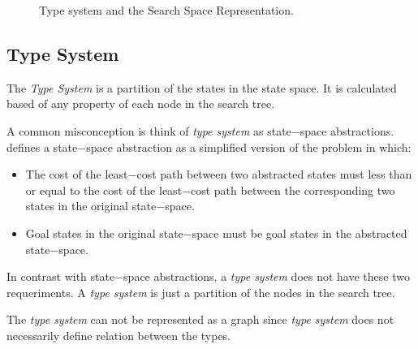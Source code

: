 \begin{figure}[htb]
\caption{Type system and the Search Space Representation.} \label{fig:ss_ts}
\end{figure}


\subsection{Type System}
The \textit{Type System} is a partition of the states in the state space. It is calculated based of any property of each node in the search tree. \cite{Lelis2013CC}

A common misconception is think of \textit{type system} as state$-$space abstractions. \cite{Prieditis93} defines a state$-$space abstraction as a simplified version of the problem in which:
\begin{itemize}
\item The cost of the least$-$cost path between two abstracted states must less than or equal to the cost of the least$-$cost path between the corresponding two states in the original state$-$space.
\item Goal states in the original state$-$space must be goal states in the abstracted state$-$space.
\end{itemize}

In contrast with state$-$space abstractions, a \textit{type system} does not have these two requeriments. A \textit{type system} is just a partition of the nodes in the search tree.

The \textit{type system} can not be represented as a graph since \textit{type system} does not necessarily define relation between the types.


